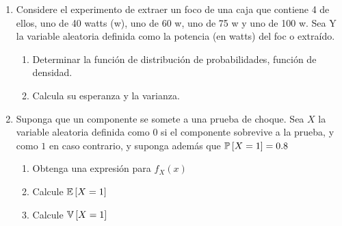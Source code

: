\begin{Ejer}
\begin{enumerate}
\begin{enumerate}
\item Encuentre la probabilidad de que dos de los cuatro componentes rindan más de 1000 horas,
\item Encuentre la probabilidad de que el subsistema funcione más de 1500 horas.
\end{enumerate}
\item Considere el experimento de extraer un foco de una caja que contiene 4 de ellos, uno de 40 watts (w), uno de 60 w, uno de 75 w y uno de 100 w. Sea Y la variable aleatoria definida como la potencia (en watts) del foc o extraído.
\begin{enumerate}
\item Determinar la función de distribución de probabilidades, función de densidad.
\item Calcula su esperanza y la varianza.
\end{enumerate}

\item Suponga que un componente se somete a una prueba de choque. Sea $X$ la variable aleatoria definida como $0$ si el componente sobrevive a la prueba, y como $1$ en caso contrario, y suponga además que $\mathbb{P}\left[X=1\right]=0.8$
\begin{enumerate}
\item Obtenga una expresión para $f_{X}\left(x\right)$
\item Calcule $\mathbb{E}\left[X=1\right]$
\item Calcule $\mathbb{V}\left[X=1\right]$
\end{enumerate}


\end{enumerate}
\end{Ejer}
